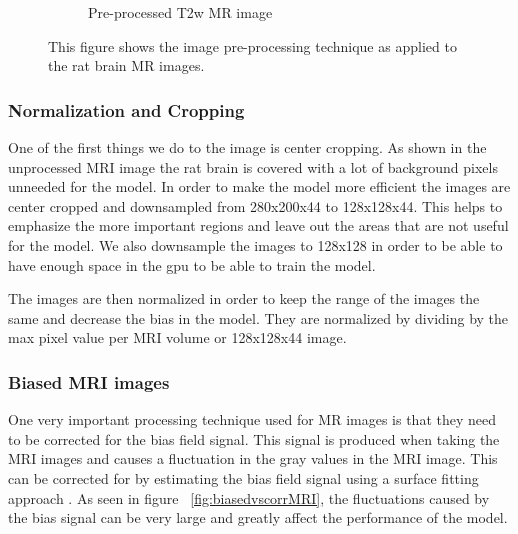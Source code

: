 \begin{figure}
\begin{subfigure}{.5\textwidth}
  \caption{Pre-processed T2w MR image}
  \label{fig:processedMRI}
\end{subfigure}
\caption{This figure shows the image pre-processing technique as applied to the rat brain MR images.}
\label{fig:procvsUnproccMRI}
\end{figure}

\subsubsection{Normalization and Cropping}
    One of the first things we do to the image is center cropping. 
    As shown in the unprocessed MRI image the rat brain is covered with a lot of background pixels unneeded for the model.
    In order to make the model more efficient the images are center cropped and downsampled from 280x200x44 to 128x128x44.
    This helps to emphasize the more important regions and leave out the areas that are not useful for the model. 
    We also downsample the images to 128x128 in order to be able to have enough space in the gpu to be able to train the model.
    
    The images are then normalized in order to keep the range of the images the same and decrease the bias in the model. 
    They are normalized by dividing by the max pixel value per MRI volume or 128x128x44 image.


\subsubsection{Biased MRI images}
     One very important processing technique used for MR images is that they need to be corrected for the bias field signal. 
     This signal is produced when taking the MRI images and causes a fluctuation in the gray values in the MRI image. 
     This can be corrected for by estimating the bias field signal using a surface fitting approach \cite{Juntu2005BiasFC}. 
     As seen in figure ~\ref{fig:biasedvscorrMRI}, the fluctuations caused by the bias signal can be very large and greatly affect the performance of the model. 
    
